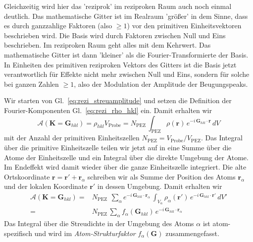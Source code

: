 Gleichzeitig wird hier das 'reziprok' im reziproken Raum auch noch einmal deutlich. Das mathematische Gitter ist im Realraum 'größer' in dem Sinne, dass es durch ganzzahlige Faktoren (also $\ge 1$) vor den primitiven Einheitsvektoren beschrieben wird. Die Basis wird durch Faktoren zwischen Null und Eins beschrieben. Im reziproken Raum geht alles mit dem Kehrwert. Das mathematische Gitter ist dann 'kleiner' als die Fourier-Transformierte der Basis. In Einheiten des primitiven reziproken Vektors des Gitters ist die Basis jetzt verantwortlich für Effekte nicht mehr zwischen Null und Eins, sondern für solche bei ganzen Zahlen $\ge 1$, also der Modulation der Amplitude der Beugungspeaks.

Wir starten von Gl.~\ref{eq:rezi_streuamplitude} und setzen die Definition der Fourier-Komponenten Gl.~\ref{eq:rezi_rho_hkl} ein. Damit erhalten wir
\begin{equation}
\mathcal{A}(\mathbf{K} = \mathbf{G}_{hkl} ) 
=  \rho_{hkl} V_\text{Probe}
=  N_\text{PEZ} \, \int_\text{PEZ}    \rho(\mathbf{r})\,  e^{-i \, \mathbf{G}_{hkl} \cdot \mathbf{r}} \, dV 
\end{equation}
mit der Anzahl der primitiven Einheitszellen $ N_\text{PEZ} =  V_\text{Probe} / V_\text{PEZ}$.
Das Integral über die primitive Einheitszelle teilen wir jetzt auf in eine Summe über die Atome der Einheitszelle und ein Integral über die direkte Umgebung der Atome. Im Endeffekt wird damit wieder über die ganze Einheitszelle integriert. Die alte Ortskoordinate  $\mathbf{r} =  \mathbf{r}' +  \mathbf{r}_\alpha$ schreiben wir als Summe der Position des Atoms  $\mathbf{r}_\alpha$ und der lokalen Koordinate $\mathbf{r}'$ in dessen Umgebung. Damit erhalten wir
\begin{align}
\mathcal{A}(\mathbf{K} = \mathbf{G}_{hkl} ) 
=   &  N_\text{PEZ}  \, \
\sum_\alpha e^{-i \, \mathbf{G}_{hkl} \cdot \mathbf{r}_\alpha} \, \int_{V_\alpha}  
 \rho_\alpha(\mathbf{r'})\,  e^{-i \, \mathbf{G}_{hkl} \cdot \mathbf{r'}} \, dV' \\
 = &
 N_\text{PEZ} \, 
\sum_\alpha f_\alpha ( \mathbf{G}_{hkl} ) \, e^{-i \, \mathbf{G}_{hkl} \cdot \mathbf{r}_\alpha} 
\end{align}
Das Integral über die Streudichte in der Umgebung des Atoms $\alpha$ ist atom-spezifisch und wird im \emph{Atom-Strukturfaktor} $f_\alpha ( \mathbf{G} )$ zusammengefasst.

